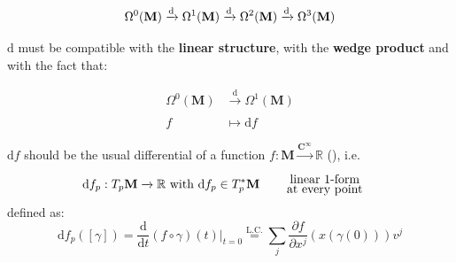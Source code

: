 \documentclass[../main.tex]{subfiles}
\begin{document}
\[
\Omega^0(\mathbf{M})\xrightarrow[]{\textrm{d}}\Omega^1(\mathbf{M})\xrightarrow[]{\textrm{\textrm{d}}}\Omega^2(\mathbf{M})\xrightarrow[]{\textrm{d}}\Omega^3(\mathbf{M})
\]

$\textrm{d}$ must be compatible with the \textbf{linear structure}, with the \textbf{wedge product} and with the fact that:

\[
\begin{split}
\Omega^0(\mathbf{M}) & \xrightarrow[]{\textrm{d}} \Omega^1(\mathbf{M})\\
f &\mapsto \textrm{d}f
\end{split}
\]

$\textrm{d}f$ should be the usual differential of a function $f:\mathbf{M}\xrightarrow[]{\mathbf{C}^{\infty}}\mathbb{R}$ (), i.e.
\[
\textrm{d}f_p: T_p\mathbf{M}\xrightarrow[]{}\mathbb{R} \ \textrm{with} \ \textrm{d}f_p\in T_p^*\mathbf{M} \quad  \text{\parbox{3 cm}{\centering linear 1-form \\[-4pt]  at every point}}
\]
defined as:
\[
\textrm{d}f_p([\gamma])=\frac{\textrm{d}}{\textrm{d}t}(f\circ\gamma)(t)\big|_{t=0}\overset{\textrm{L.C.}}{=}\sum_j\frac{\partial f}{\partial x^j}\left(x(\gamma(0))\right)v^j
\]
\end{document}
